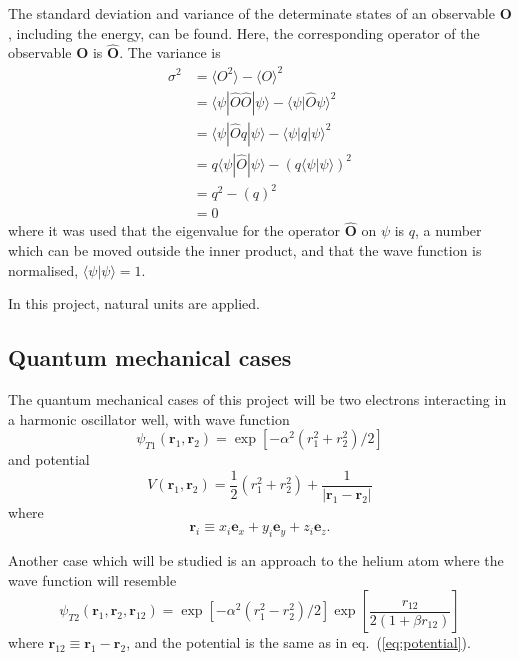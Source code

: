 \documentclass[a4paper,11pt]{article}
\begin{document}
The standard deviation and variance of the determinate states of an observable $\mathbf{O}$, including the energy, can be found. Here, the corresponding operator of the observable $\mathbf{O}$ is $\hat{\mathbf{O}}$. The variance is
\begin{align*}
    \sigma^2 &= \langle O^2 \rangle - \langle O \rangle^2 \\
    &=  \langle \psi | \hat{O} \hat{O} | \psi \rangle - \langle \psi | \hat{O} \psi \rangle^2 \\
    &=  \langle \psi | \hat{O} q | \psi \rangle - \langle \psi | q | \psi \rangle^2 \\
    &= q \langle \psi | \hat{O} | \psi \rangle - \left( q \langle \psi | \psi \rangle \right)^2 \\
    &= q^2 - \left( q \right)^2 \\
    &= 0
\end{align*}
where it was used that the eigenvalue for the operator $\hat{\mathbf{O}}$ on $\psi$ is $q$, a number which can be moved outside the inner product, and that the wave function is normalised, $\langle \psi | \psi \rangle = 1$.

In this project, natural units are applied.

\subsection{Quantum mechanical cases}
The quantum mechanical cases of this project will be two electrons interacting in a harmonic oscillator well, with wave function
\begin{equation}
    \psi_{T1}(\mathbf{r}_1, \mathbf{r}_2) = \exp \left[ -\alpha^2 \left( r_1^2 + r_2^2  \right)/2 \right]
    \label{eq:wavefuncT1}
\end{equation}
and potential
\begin{equation}
    V(\mathbf{r}_1, \mathbf{r}_2) = \frac{1}{2} \left( r_1^2 + r_2^2 \right) + \frac{1}{|\mathbf{r}_1 - \mathbf{r}_2 | }
    \label{eq:potential}
\end{equation}
where 
\[ \mathbf{r}_i \equiv x_i \mathbf{e}_x + y_i \mathbf{e}_y + z_i \mathbf{e}_z. \]

Another case which will be studied is an approach to the helium atom where the wave function will resemble 
\begin{equation}
    \psi_{T2}(\mathbf{r}_1, \mathbf{r}_2, \mathbf{r}_{12}) = \exp \left[ -\alpha^2 \left( r_1^2 - r_2^2 \right)/2 \right] \exp \left[ \frac{r_{12}}{2(1 + \beta r_{12})} \right]
    \label{eq:wavefuncT2}
\end{equation}
where $\mathbf{r}_{12} \equiv \mathbf{r}_1 - \mathbf{r}_2$, and the potential is the same as in eq.~(\ref{eq:potential}).
\end{document}
